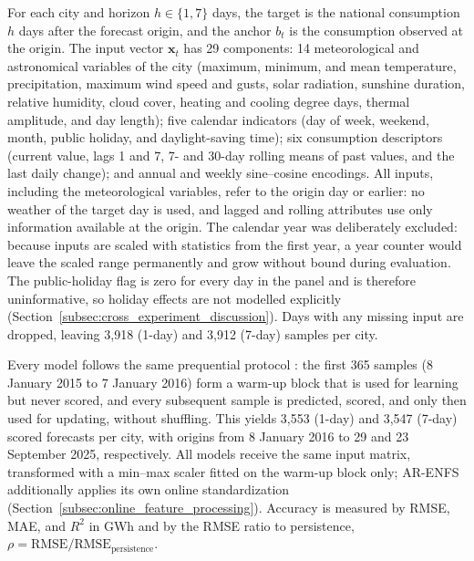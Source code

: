 \documentclass[preprint,12pt]{elsarticle}
\begin{document}
For each city and horizon $h\in\{1,7\}$ days, the target is the national consumption $h$ days after the forecast origin, and the anchor $b_t$ is the consumption observed at the origin. The input vector $\mathbf{x}_t$ has 29 components: 14 meteorological and astronomical variables of the city (maximum, minimum, and mean temperature, precipitation, maximum wind speed and gusts, solar radiation, sunshine duration, relative humidity, cloud cover, heating and cooling degree days, thermal amplitude, and day length); five calendar indicators (day of week, weekend, month, public holiday, and daylight-saving time); six consumption descriptors (current value, lags 1 and 7, 7- and 30-day rolling means of past values, and the last daily change); and annual and weekly sine--cosine encodings. All inputs, including the meteorological variables, refer to the origin day or earlier: no weather of the target day is used, and lagged and rolling attributes use only information available at the origin. The calendar year was deliberately excluded: because inputs are scaled with statistics from the first year, a year counter would leave the scaled range permanently and grow without bound during evaluation. The public-holiday flag is zero for every day in the panel and is therefore uninformative, so holiday effects are not modelled explicitly (Section~\ref{subsec:cross_experiment_discussion}). Days with any missing input are dropped, leaving 3{,}918 (1-day) and 3{,}912 (7-day) samples per city.

\label{subsec:protocol}
Every model follows the same prequential protocol \citep{dawid1984prequential,gama2013evaluating}: the first 365 samples (8 January 2015 to 7 January 2016) form a warm-up block that is used for learning but never scored, and every subsequent sample is predicted, scored, and only then used for updating, without shuffling. This yields 3{,}553 (1-day) and 3{,}547 (7-day) scored forecasts per city, with origins from 8 January 2016 to 29 and 23 September 2025, respectively. All models receive the same input matrix, transformed with a min--max scaler fitted on the warm-up block only; AR-ENFS additionally applies its own online standardization (Section~\ref{subsec:online_feature_processing}). Accuracy is measured by RMSE, MAE, and $R^2$ in GWh and by the RMSE ratio to persistence, $\rho = \mathrm{RMSE}/\mathrm{RMSE}_{\mathrm{persistence}}$.
\end{document}
